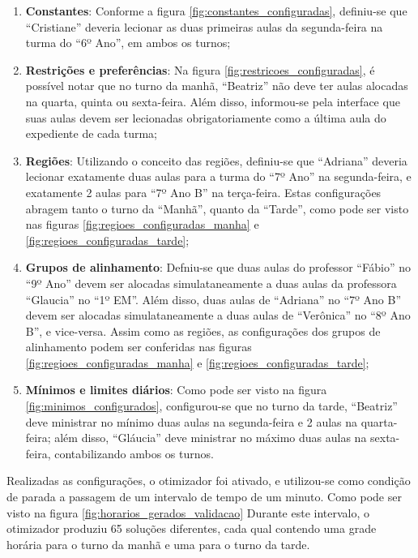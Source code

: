 \begin{enumerate}
	\item \label{item_constantes} \textbf{Constantes}: Conforme a figura \ref{fig:constantes_configuradas}, definiu-se que ``Cristiane'' deveria lecionar as duas primeiras aulas da segunda-feira na turma do ``6º Ano'', em ambos os turnos;
	\item \label{item_restricoes} \textbf{Restrições e preferências}: Na figura \ref{fig:restricoes_configuradas}, é possível notar que no turno da manhã, ``Beatriz'' não deve ter aulas alocadas na quarta, quinta ou sexta-feira. Além disso, informou-se pela interface que suas aulas devem ser lecionadas obrigatoriamente como a última aula do expediente de cada turma;
	\item \label{item_regioes} \textbf{Regiões}: Utilizando o conceito das regiões, definiu-se que ``Adriana'' deveria lecionar exatamente duas aulas para a turma do ``7º Ano'' na segunda-feira, e exatamente 2 aulas para ``7º Ano B'' na terça-feira. Estas configurações abragem tanto o turno da ``Manhã'', quanto da ``Tarde'', como pode ser visto nas figuras \ref{fig:regioes_configuradas_manha} e \ref{fig:regioes_configuradas_tarde};
	\item \label{item_grupos} \textbf{Grupos de alinhamento}: Defniu-se que duas aulas do professor ``Fábio'' no ``9º Ano'' devem ser alocadas simulataneamente a duas aulas da professora ``Glaucia'' no ``1º EM''. Além disso, duas aulas de ``Adriana'' no ``7º Ano B'' devem ser alocadas simulataneamente a duas aulas de ``Verônica'' no ``8º Ano B'', e vice-versa. Assim como as regiões, as configurações dos grupos de alinhamento podem ser conferidas nas figuras \ref{fig:regioes_configuradas_manha} e \ref{fig:regioes_configuradas_tarde};
	\item \label{item_minimos} \textbf{Mínimos e limites diários}: Como pode ser visto na figura \ref{fig:minimos_configurados}, configurou-se que no turno da tarde, ``Beatriz'' deve ministrar no mínimo duas aulas na segunda-feira e 2 aulas na quarta-feira; além disso, ``Gláucia'' deve ministrar no máximo duas aulas na sexta-feira, contabilizando ambos os turnos.
\end{enumerate}

Realizadas as configurações, o otimizador foi ativado, e utilizou-se como condição de parada a passagem de um intervalo de tempo de um minuto. Como pode ser visto na figura \ref{fig:horarios_gerados_validacao} Durante este intervalo, o otimizador produziu 65 soluções diferentes, cada qual contendo uma grade horária para o turno da manhã e uma para o turno da tarde.

